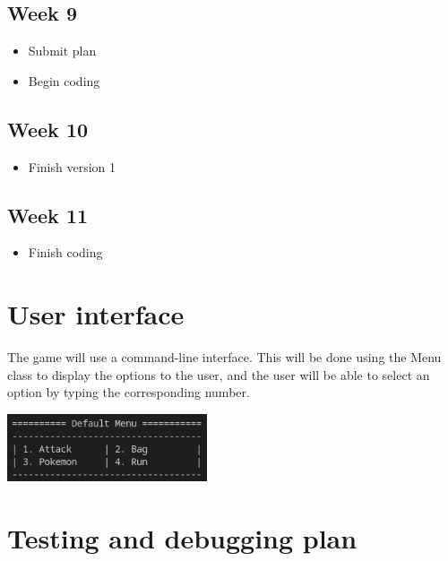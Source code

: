 \documentclass{article}
\begin{document}
  \subsection*{Week 9}
  \begin{itemize}
    \item Submit plan
    \item Begin coding
  \end{itemize}
  
  \subsection*{Week 10}
  \begin{itemize}
    \item Finish version 1
  \end{itemize}
  
  \subsection*{Week 11}
  \begin{itemize}
    \item Finish coding
  \end{itemize}
  
  \pagebreak
  
  \section{User interface}
  
  The game will use a command-line interface. This will be done using the Menu class to display the options to the user, and the user will be able to select an option by typing the corresponding number. 
  
  \begin{center}\includegraphics[height=2cm]{media/Menu.png}\end{center}
  
  \section{Testing and debugging plan}
  
  \lipsum[1-2]
  
\end{document}
